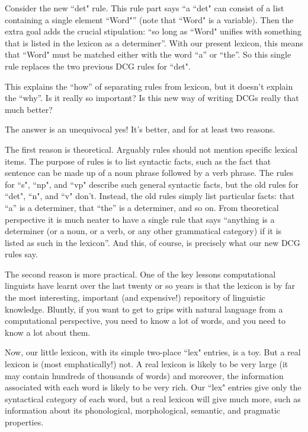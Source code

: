 Consider the new ``det" rule. This rule part says ``a ``det"
can consist of a list containing a single element ``Word"'' (note
that ``Word" is a variable). Then the extra goal adds the crucial
stipulation: ``so long as ``Word" unifies  with something that is
listed in the lexicon as a determiner''.  With our present lexicon,
this means that ``Word" must be matched either with the word ``a''
or ``the''.  So this single rule replaces the two previous DCG rules
for ``det".

This explains the ``how'' of separating rules from lexicon, but it
doesn't explain the ``why''. Is it really so important? Is this new
way of writing DCGs really that much better?

The answer is an unequivocal yes! It's  better, and for
at least two reasons.

The first reason is theoretical. Arguably rules should not mention
specific lexical items. The purpose of rules is to list
 syntactic facts, such as the fact that sentence can
be made up of a noun phrase followed by a verb phrase. The rules for
``s", ``np", and ``vp" describe such general syntactic facts, but the old
rules for ``det", ``n", and ``v" don't. Instead, the old rules simply
list particular facts: that ``a'' is a determiner, that ``the'' is a
determiner, and so on.  From theoretical perspective it is much neater
to have a single rule that says ``anything is a determiner (or a noun,
or a verb, or any other grammatical category) if it is listed as such
in the lexicon''. And this, of course, is precisely what our new DCG
rules say.

The second reason is more practical. One of the key lessons
computational linguists have learnt over the last twenty or so years
is that the lexicon is by far the most interesting, important (and
expensive!) repository of linguistic knowledge. Bluntly, if you want
to get to grips with natural language from a computational perspective,
you need to know a lot of words, and you need to know a lot about them.

 Now, our little lexicon, with its simple two-place ``lex" entries, is
a toy. But a real lexicon is (most emphatically!) not. A real lexicon
is likely to be very large (it may contain hundreds of thousands of
words) and moreover, the information associated with each word is
likely to be very rich.  Our ``lex" entries give only the syntactical
category of each word, but a real lexicon will give much more, such as
information about its phonological, morphological, semantic, and
pragmatic properties.

